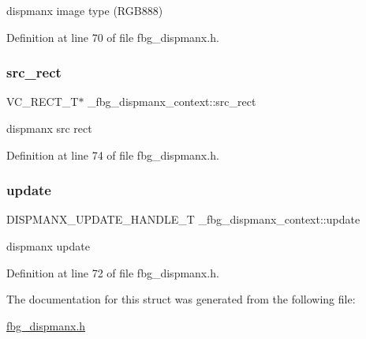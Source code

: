 dispmanx image type (R\+G\+B888) 



Definition at line 70 of file fbg\+\_\+dispmanx.\+h.

\mbox{\label{struct__fbg__dispmanx__context_aef1016d77620bbfd67bf090fd2f08e19}} 
\subsubsection{\texorpdfstring{src\+\_\+rect}{src\_rect}}
{\footnotesize\ttfamily V\+C\+\_\+\+R\+E\+C\+T\+\_\+T$\ast$ \+\_\+fbg\+\_\+dispmanx\+\_\+context\+::src\+\_\+rect}



dispmanx src rect 



Definition at line 74 of file fbg\+\_\+dispmanx.\+h.

\mbox{\label{struct__fbg__dispmanx__context_a583202df9f959780bc21e9e5ce824f34}} 
\subsubsection{\texorpdfstring{update}{update}}
{\footnotesize\ttfamily D\+I\+S\+P\+M\+A\+N\+X\+\_\+\+U\+P\+D\+A\+T\+E\+\_\+\+H\+A\+N\+D\+L\+E\+\_\+T \+\_\+fbg\+\_\+dispmanx\+\_\+context\+::update}



dispmanx update 



Definition at line 72 of file fbg\+\_\+dispmanx.\+h.



The documentation for this struct was generated from the following file\+:\begin{DoxyCompactItemize}
\item 
\hyperlink{fbg__dispmanx_8h}{fbg\+\_\+dispmanx.\+h}\end{DoxyCompactItemize}
